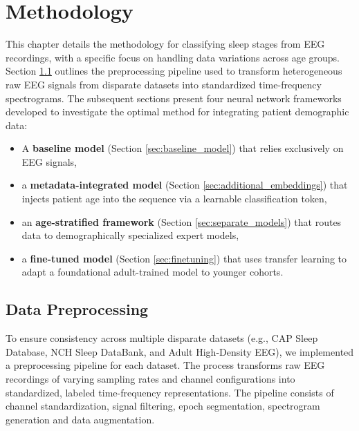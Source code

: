 \chapter{Methodology} \label{chapter:methodology}

This chapter details the methodology for classifying sleep stages from EEG recordings, with a specific focus on handling data variations across age groups. 
Section \ref{sec:data_preprocessing} outlines the preprocessing pipeline used to transform heterogeneous raw EEG signals from disparate datasets into standardized time-frequency spectrograms. 
The subsequent sections present four neural network frameworks developed to investigate the optimal method for integrating patient demographic data:
\begin{itemize}
    \item A \textbf{baseline model} (Section \ref{sec:baseline_model}) that relies exclusively on EEG signals,
    \item a \textbf{metadata-integrated model} (Section \ref{sec:additional_embeddings}) that injects patient age into the sequence via a learnable classification token,
    \item an \textbf{age-stratified framework} (Section \ref{sec:separate_models}) that routes data to demographically specialized expert models,
    \item a \textbf{fine-tuned model} (Section \ref{sec:finetuning}) that uses transfer learning to adapt a foundational adult-trained model to younger cohorts.
\end{itemize}


\section{Data Preprocessing}
\label{sec:data_preprocessing}

To ensure consistency across multiple disparate datasets (e.g., CAP Sleep Database, NCH Sleep DataBank, and Adult High-Density EEG),
we implemented a preprocessing pipeline for each dataset. 
The process transforms raw EEG recordings of 
varying sampling rates and channel configurations into standardized, 
labeled time-frequency representations. 
The pipeline consists of channel standardization, signal filtering,
epoch segmentation, spectrogram generation and data augmentation.

